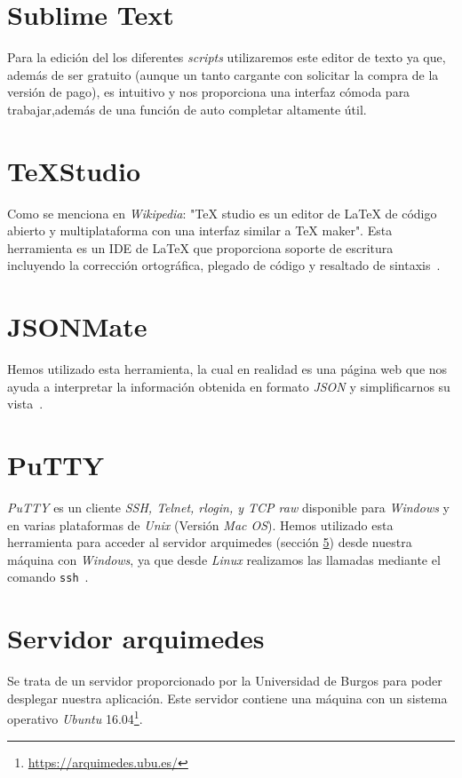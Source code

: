\section{Sublime Text}
Para la edición del los diferentes \textit{scripts} utilizaremos este editor de texto ya que, además de ser gratuito (aunque un tanto cargante con solicitar la compra de la versión de pago), es intuitivo y nos proporciona una interfaz cómoda para trabajar,además de una función de auto completar altamente útil.

\section{\TeX Studio}
Como se menciona en \textit{Wikipedia}: "\TeX{} studio es un editor de \LaTeX{} de código abierto y multiplataforma con una interfaz similar a \TeX{} maker". Esta herramienta es un IDE de \LaTeX{} que proporciona soporte de escritura incluyendo la corrección ortográfica, plegado de código y resaltado de sintaxis~\cite{wiki:texstudio}.


\section{JSONMate}
Hemos utilizado esta herramienta, la cual en realidad es una página web que nos ayuda a interpretar la información obtenida en formato \textit{JSON} y simplificarnos su vista~\cite{json:jsnomate}.

\section{PuTTY}
\textit{PuTTY} es un cliente \textit{SSH, Telnet, rlogin, y TCP raw} disponible para \textit{Windows} y en varias plataformas de \textit{Unix} (Versión \textit{Mac OS}). Hemos utilizado esta herramienta para acceder al servidor arquimedes (sección \ref{sec:arquimedes}) desde nuestra máquina con \textit{Windows}, ya que desde \textit{Linux} realizamos las llamadas mediante el comando \texttt{ssh}~\cite{wiki:putty}.

\section{Servidor arquimedes}\label{sec:arquimedes}
Se trata de un servidor proporcionado por la Universidad de Burgos para poder desplegar nuestra aplicación. Este servidor contiene una máquina con un sistema operativo \textit{Ubuntu} 16.04\footnote{\url{https://arquimedes.ubu.es/}}.

